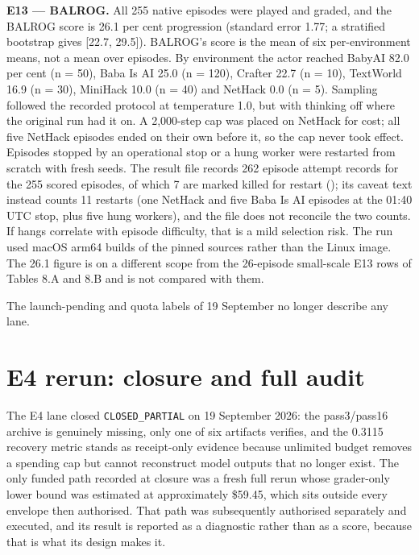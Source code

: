 \documentclass[12pt,a4paper]{report}
\newcommand{\longtok}[1]{\texttt{\seqsplit{#1}}}
\begin{document}
\textbf{E13 --- BALROG.} All 255 native episodes were played and graded,
and the BALROG score is 26.1 per cent progression (standard error 1.77;
a stratified bootstrap gives {[}22.7, 29.5{]}). BALROG's score is the
mean of six per-environment means, not a mean over episodes. By
environment the actor reached BabyAI 82.0 per cent (n = 50), Baba Is AI
25.0 (n = 120), Crafter 22.7 (n = 10), TextWorld 16.9 (n = 30), MiniHack
10.0 (n = 40) and NetHack 0.0 (n = 5). Sampling followed the recorded
protocol at temperature 1.0, but with thinking off where the original
run had it on. A 2,000-step cap was placed on NetHack for cost; all five
NetHack episodes ended on their own before it, so the cap never took
effect. Episodes stopped by an operational stop or a hung worker were
restarted from scratch with fresh seeds. The result file records 262
episode attempt records for the 255 scored episodes, of which 7 are
marked killed for restart (\longtok{n\_killed\_\allowbreak{}for\_\allowbreak{}restart\_\allowbreak{}records});
its caveat text instead counts 11 restarts (one NetHack and five Baba Is
AI episodes at the 01:40 UTC stop, plus five hung workers), and the file
does not reconcile the two counts. If hangs correlate with episode
difficulty, that is a mild selection risk. The run used macOS arm64
builds of the pinned sources rather than the Linux image. The 26.1
figure is on a different scope from the 26-episode small-scale E13 rows
of Tables 8.A and 8.B and is not compared with them.

The launch-pending and quota labels of 19 September no longer describe
any lane.

\section{E4 rerun: closure and full
audit}\label{e4-rerun-closure-and-full-audit}

The E4 lane closed \texttt{CLOSED\_PARTIAL} on 19 September 2026: the
pass3/pass16 archive is genuinely missing, only one of six artifacts
verifies, and the 0.3115 recovery metric stands as receipt-only evidence
because unlimited budget removes a spending cap but cannot reconstruct
model outputs that no longer exist. The only funded path recorded at
closure was a fresh full rerun whose grader-only lower bound was
estimated at approximately \$59.45, which sits outside every envelope
then authorised. That path was subsequently authorised separately and
executed, and its result is reported as a diagnostic rather than as a
score, because that is what its design makes it.
\end{document}
